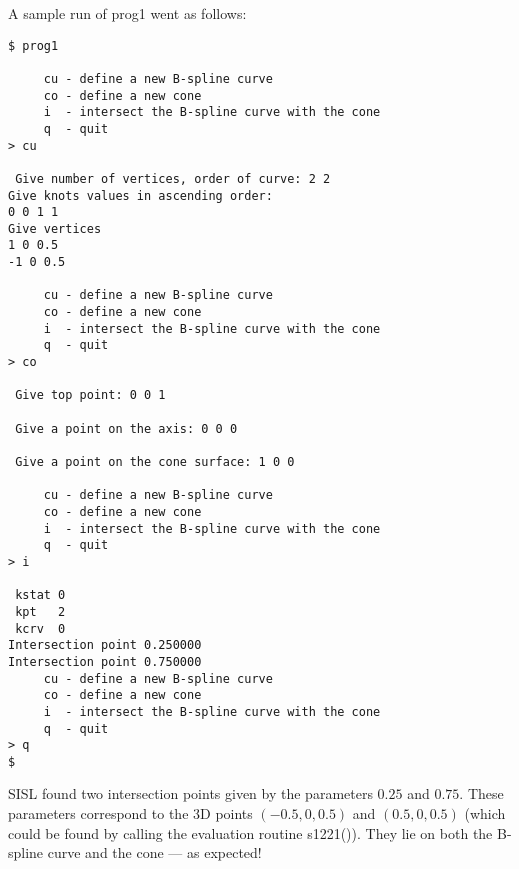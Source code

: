 A sample run of prog1 went as follows:
\begin{verbatim}
$ prog1

     cu - define a new B-spline curve
     co - define a new cone
     i  - intersect the B-spline curve with the cone
     q  - quit
> cu

 Give number of vertices, order of curve: 2 2
Give knots values in ascending order:
0 0 1 1
Give vertices
1 0 0.5
-1 0 0.5

     cu - define a new B-spline curve
     co - define a new cone
     i  - intersect the B-spline curve with the cone
     q  - quit
> co

 Give top point: 0 0 1

 Give a point on the axis: 0 0 0

 Give a point on the cone surface: 1 0 0

     cu - define a new B-spline curve
     co - define a new cone
     i  - intersect the B-spline curve with the cone
     q  - quit
> i

 kstat 0
 kpt   2
 kcrv  0
Intersection point 0.250000
Intersection point 0.750000
     cu - define a new B-spline curve
     co - define a new cone
     i  - intersect the B-spline curve with the cone
     q  - quit
> q
$
\end{verbatim}
SISL found two intersection points given by the parameters
$0.25$ and $0.75$. These parameters correspond to the 3D points
$(-0.5,0,0.5)$ and $(0.5,0,0.5)$ (which could be found by calling
the evaluation routine s1221()). They lie on both
the B-spline curve and the cone --- as expected!




\vfill
\newpage
